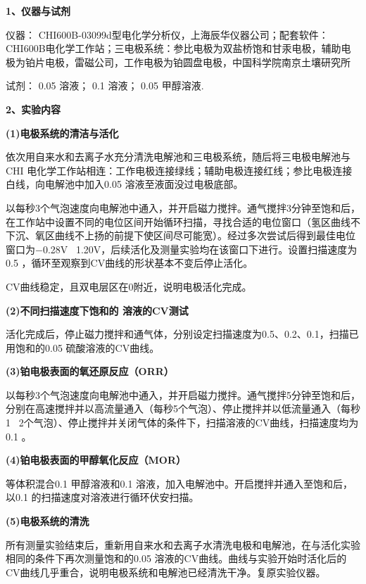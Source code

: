 \noindent \textbf{1、仪器与试剂} \par
仪器： CHI600B-03099d型电化学分析仪，上海辰华仪器公司；配套软件：CHI600B电化学工作站；三电极系统：参比电极为双盐桥饱和甘汞电极，辅助电极为铂片电极，雷磁公司，工作电极为铂圆盘电极，中国科学院南京土壤研究所\par 
试剂： 0.05   溶液； 0.1   溶液； 0.05  甲醇溶液. \par 
\noindent \textbf{2、实验内容} \par 
\noindent \textbf{(1)电极系统的清洁与活化}\par 
依次用自来水和去离子水充分清洗电解池和三电极系统，随后将三电极电解池与 CHI 电化学工作站相连：工作电极连接绿线；辅助电极连接红线；参比电极连接白线，向电解池中加入0.05   溶液至液面没过电极底部。\par 
以每秒3个气泡速度向电解池中通入，并开启磁力搅拌。通气搅拌3分钟至饱和后，在工作站中设置不同的电位区间开始循环扫描，寻找合适的电位窗口（氢区曲线不下沉、氧区曲线不上扬的前提下使区间尽可能宽）。经过多次尝试后得到最佳电位窗口为$-$0.28V\my~ 1.20V，后续活化及测量实验均在该窗口下进行。设置扫描速度为0.5 ，循环至观察到CV曲线的形状基本不变后停止活化。\par 
CV曲线稳定，且双电层区在0附近，说明电极活化完成。\par 
\noindent \textbf{(2)不同扫描速度下饱和的 溶液的CV测试} \par 
活化完成后，停止磁力搅拌和通气体，分别设定扫描速度为0.5、0.2、0.1，扫描已用饱和的0.05 硫酸溶液的CV曲线。 \par 
\noindent \textbf{(3)铂电极表面的氧还原反应（ORR）} \par 
以每秒3个气泡速度向电解池中通入，并开启磁力搅拌。通气搅拌5分钟至饱和后，分别在高速搅拌并以高流量通入（每秒5个气泡）、停止搅拌并以低流量通入（每秒1\my~ 2个气泡）、停止搅拌并关闭气体的条件下，扫描溶液的CV曲线，扫描速度均为0.1 。 \par 
\noindent \textbf{(4)铂电极表面的甲醇氧化反应（MOR）}\par 
等体积混合0.1  甲醇溶液和0.1   溶液，加入电解池中。开启搅拌并通入至饱和后，以0.1 的扫描速度对溶液进行循环伏安扫描。\par 
\noindent \textbf{(5)电极系统的清洗}\par 
所有测量实验结束后，重新用自来水和去离子水清洗电极和电解池，在与活化实验相同的条件下再次测量饱和的0.05   溶液的CV曲线。曲线与实验开始时活化后的CV曲线几乎重合，说明电极系统和电解池已经清洗干净。复原实验仪器。 \par